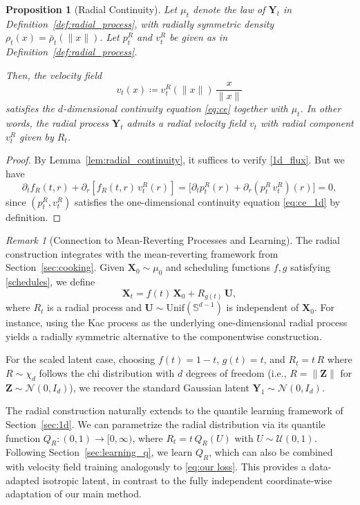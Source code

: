 \documentclass{article}
\theoremstyle{plain}
\newtheorem{proposition}[theorem]{Proposition}
\theoremstyle{definition}
\theoremstyle{remark}
\newtheorem{remark}[theorem]{Remark}
\begin{document}
\begin{proposition}[Radial Continuity]\label{prop:radial_cont}
Let $\mu_t$ denote the law of $\mathbf{Y}_t$ in Definition~\ref{def:radial_process}, with radially symmetric density $\rho_t(x) = \bar\rho_t(\|x\|)$. Let $p_t^{R}$ and $v_t^{R}$ be given as in Definition~\ref{def:radial_process}.

Then, the velocity field
\begin{equation}
v_t(x) \coloneqq v_t^{R}(\|x\|)\, \frac{x}{\|x\|}
\end{equation}
satisfies the $d$-dimensional continuity equation \eqref{eq:ce} together with $\mu_t$. In other words, the radial process $\mathbf{Y}_t$ admits a radial velocity field $v_t$ with radial component $v_t^R$ given by $R_t$.
\end{proposition}

\begin{proof}
By Lemma~\ref{lem:radial_continuity}, it suffices to verify \eqref{1d_flux}. But we have 
\begin{equation}
\partial_t f_R(t,r) + \partial_r[f_R(t,r)\, v_t^R(r)]
= \bigl[ \partial_t p_t^{R}(r) + \partial_r (p_t^{R}\, v_t^{R})(r) \bigr]
= 0,
\end{equation}
since $(p_t^{R}, v_t^{R})$ satisfies the one-dimensional continuity equation \eqref{eq:ce_1d} by definition.
\end{proof}

\begin{remark}[Connection to Mean-Reverting Processes and Learning]
The radial construction integrates with the mean-reverting framework from Section~\ref{sec:cooking}. Given $\mathbf{X}_0 \sim \mu_0$ and scheduling functions $f,g$ satisfying \eqref{schedules}, we define
\begin{equation}
\mathbf{X}_t = f(t)\,\mathbf{X}_0 + R_{g(t)}\, \mathbf{U},
\end{equation}
where $R_t$ is a radial process and $\mathbf{U} \sim \mathrm{Unif}(\mathbb{S}^{d-1})$ is independent of $\mathbf{X}_0$. For instance, using the Kac process as the underlying one-dimensional radial process yields a radially symmetric alternative to the componentwise construction. 

For the scaled latent case, choosing $f(t) = 1-t$, $g(t) = t$, and $R_t = t\, R$ where $R \sim \chi_d$ follows the chi distribution with $d$ degrees of freedom (i.e., $R = \|\mathbf{Z}\|$ for $\mathbf{Z} \sim \mathcal{N}(0,I_d)$), we recover the standard Gaussian latent $\mathbf{Y}_1 \sim \mathcal{N}(0,I_d)$.

The radial construction naturally extends to the quantile learning framework of Section~\ref{sec:1d}. We can parametrize the radial distribution via its quantile function $Q_R : (0,1) \to [0,\infty)$, where $R_t = t\, Q_R(U)$ with $U \sim \mathcal{U}(0,1)$. Following Section~\ref{sec:learning_q}, we learn $Q_R$, which can also be combined with velocity field training analogously to \eqref{eq:our loss}. This provides a data-adapted isotropic latent, in contrast to the fully independent coordinate-wise adaptation of our main method.
\end{remark}
\end{document}
